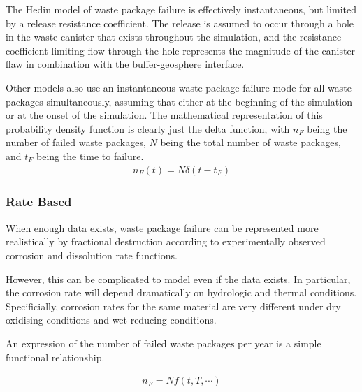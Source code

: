 The Hedin model of waste package failure is effectively instantaneous, but
limited by a release resistance coefficient. The release is assumed  to occur
through a hole in the waste canister that exists throughout the simulation, and
the resistance coefficient limiting flow through the hole represents the
magnitude of the canister flaw in combination with the buffer-geosphere
interface.  \cite{hedin_integrated_2002}

Other models also use an instantaneous waste package failure mode for all waste  
packages simultaneously, assuming that either at the beginning of the simulation
or at the onset of the simulation. The mathematical representation of this 
probability density function is clearly just the delta function, with $n_F$ 
being the number of failed waste packages, $N$ being the total number of waste 
packages, and $t_F$ being the time to failure.
\begin{align}
  n_F(t) = N\delta(t-t_F)
  \label{instantaneous}
\end{align}

\subsubsection{Rate Based} 

When enough data exists, waste package failure can
be represented more  realistically by fractional destruction according to
experimentally observed corrosion and dissolution rate functions.

However, this can be complicated to model even if the data exists. In
particular, the corrosion rate will depend dramatically on hydrologic and
thermal conditions. Specificially, corrosion rates for the same material are
very different under dry oxidising conditions and wet reducing conditions. 


An expression of the number of failed waste packages per year is a simple 
functional relationship. 

\begin{align}
  n_F = Nf(t,T,\cdots)
  \label{rate}
\end{align}

